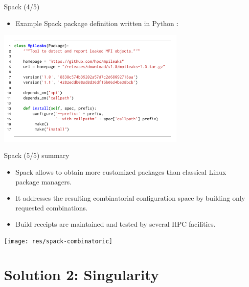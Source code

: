 \documentclass[xcolor=svgnames,xcolor=table,aspectratio=169]{beamer}
\begin{document}
\begin{frame}{Spack (4/5)}
\begin{itemize}
\item
Example Spack package definition written in Python \cite{Gamblin2015}:
\end{itemize}
\begin{center}
\includegraphics[width=0.7\textwidth]{res/spack-spec}
\end{center}
\end{frame}



\begin{frame}{Spack (5/5) summary}
\begin{itemize}
\item
Spack allows to obtain more customized packages
than classical Linux package managers.

\item
It addresses the resulting combinatorial configuration space
by building only requested combinations.

\item
Build receipts are maintained and tested by several HPC facilities.
\end{itemize}
\begin{center}
\texttt{[image: res/spack-combinatoric]}
\end{center}
\end{frame}



\section{Solution 2: Singularity}
\frame{\tableofcontents[currentsection]}
\end{document}
